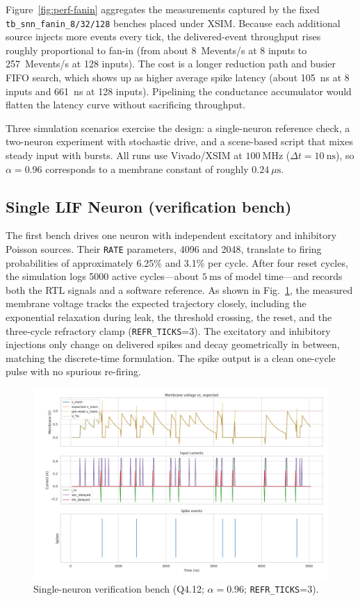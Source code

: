 \documentclass[10pt,onecolumn]{IEEEtran}
\begin{document}
Figure~\ref{fig:perf-fanin} aggregates the measurements captured by the fixed \texttt{tb\_snn\_fanin\_8/32/128} benches placed under XSIM. Because each additional source injects more events every tick, the delivered-event throughput rises roughly proportional to fan-in (from about 8~Mevents/s at 8 inputs to 257~Mevents/s at 128 inputs). The cost is a longer reduction path and busier FIFO search, which shows up as higher average spike latency (about 105~ns at 8 inputs and 661~ns at 128 inputs). Pipelining the conductance accumulator would flatten the latency curve without sacrificing throughput.

Three simulation scenarios exercise the design: a single-neuron reference check, a two-neuron experiment with stochastic drive, and a scene-based script that mixes steady input with bursts. All runs use Vivado/XSIM at \(100~\mathrm{MHz}\) (\(\Delta t=10~\mathrm{ns}\)), so \(\alpha=0.96\) corresponds to a membrane constant of roughly \(0.24~\mu\mathrm{s}\).

\subsection{Single LIF Neuron (verification bench)}
The first bench drives one neuron with independent excitatory and inhibitory Poisson sources. Their \texttt{RATE} parameters, 4096 and 2048, translate to firing probabilities of approximately 6.25\% and 3.1\% per cycle. After four reset cycles, the simulation logs 5000 active cycles—about \(5~\mathrm{ms}\) of model time—and records both the RTL signals and a software reference. As shown in Fig.~\ref{fig:tb-lif}, the measured membrane voltage tracks the expected trajectory closely, including the exponential relaxation during leak, the threshold crossing, the reset, and the three-cycle refractory clamp (\texttt{REFR\_TICKS}=3). The excitatory and inhibitory injections only change on delivered spikes and decay geometrically in between, matching the discrete-time formulation. The spike output is a clean one-cycle pulse with no spurious re-firing.

\begin{figure}[htbp!]
  \centering
  \includegraphics[width=0.585\linewidth]{lif_neuron_trace.png}
  \caption{Single-neuron verification bench (Q4.12; \(\alpha=0.96\); \texttt{REFR\_TICKS}=3).}
  \label{fig:tb-lif}
\end{figure}
\end{document}
